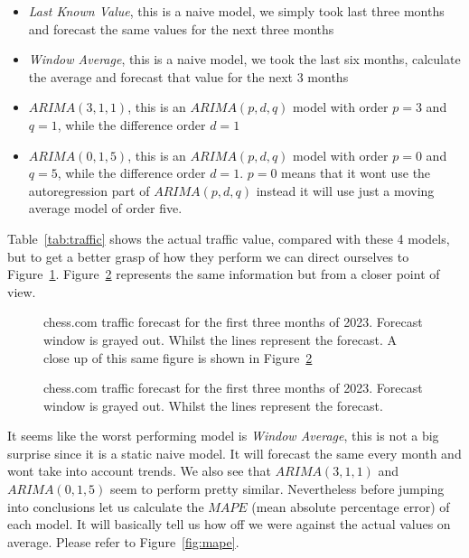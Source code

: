 \documentclass[journal]{IEEEtran}
\begin{document}
\begin{itemize}

    \item \emph{Last Known Value}, this is a naive model, we simply took last
        three months and forecast the same values for the next three months

    \item \emph{Window Average}, this is a naive model, we took the last six
        months, calculate the average and forecast that value for the next 3
        months

    \item \emph{$ARIMA(3,1,1)$}, this is an $ARIMA(p,d,q)$  model with order
        $p=3$ and $q=1$, while the difference order $d=1$

    \item \emph{$ARIMA(0,1,5)$}, this is an $ARIMA(p,d,q)$  model with order
        $p=0$ and $q=5$, while the difference order $d=1$. $p=0$ means that it
        wont use the autoregression part of $ARIMA(p,d,q)$ instead it will use
        just a moving average model of order five.

\end{itemize}

Table~\ref{tab:traffic} shows the actual traffic value, compared with these 4
models, but to get a better grasp of how they perform we can direct ourselves to
Figure~\ref{fig:forecast-large}. Figure~\ref{fig:forecast-zoom} represents the
same information but from a closer point of view.

\begin{figure}[htbp]
  \centering
  
    \caption{chess.com traffic forecast for the first three months of 2023.
    Forecast window is grayed out. Whilst the lines represent the forecast. A
    close up of this same figure is shown in Figure~\ref{fig:forecast-zoom}}
    \label{fig:forecast-large}
\end{figure}

\begin{figure}[htbp]
  \centering
  
    \caption{chess.com traffic forecast for the first three months of 2023.
    Forecast window is grayed out. Whilst the lines represent the forecast.}
    \label{fig:forecast-zoom}
\end{figure}

It seems like the worst performing model is \emph{Window Average}, this is not
a big surprise since it is a static naive model. It will forecast the same
every month and wont take into account trends. We also see that $ARIMA(3,1,1)$
and $ARIMA(0,1,5)$ seem to perform pretty similar. Nevertheless before jumping
into conclusions let us calculate the $MAPE$ (mean absolute percentage error)
of each model. It will basically tell us how off we were against the actual
values on average. Please refer to Figure~\ref{fig:mape}.
\end{document}
